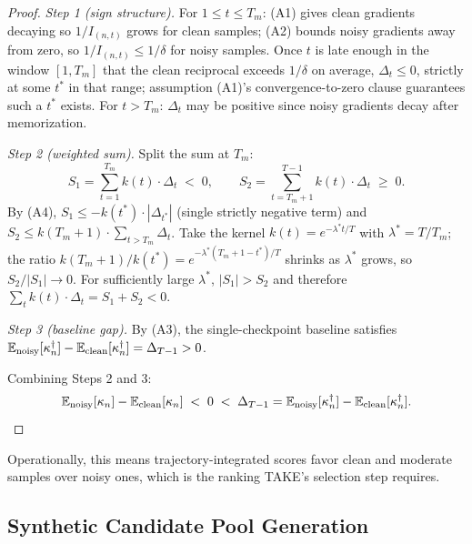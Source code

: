 \begin{foldable}
\begin{proof}
    \textit{Step 1 (sign structure).}
    For $1 \leq t \leq T_m$: (A1) gives clean gradients decaying so $1/I_{(n,t)}$ grows for clean samples; (A2) bounds noisy gradients away from zero, so $1/I_{(n,t)} \leq 1/\delta$ for noisy samples.
    Once $t$ is late enough in the window $[1, T_m]$ that the clean reciprocal exceeds $1/\delta$ on average, $\Delta_t \leq 0$, strictly at some $t^*$ in that range; assumption (A1)'s convergence-to-zero clause guarantees such a $t^*$ exists.
    For $t > T_m$: $\Delta_t$ may be positive since noisy gradients decay after memorization.

    \textit{Step 2 (weighted sum).}
    Split the sum at $T_m$:
    \begin{equation*}
      S_1 = \sum_{t=1}^{T_m} k(t) \cdot \Delta_t \;<\; 0,
      \qquad
      S_2 = \sum_{t=T_m+1}^{T-1} k(t) \cdot \Delta_t \;\geq\; 0.
    \end{equation*}
    By (A4), $S_1 \leq -k(t^*) \cdot |\Delta_{t^*}|$ (single strictly negative term) and $S_2 \leq k(T_m+1) \cdot \sum_{t > T_m} \Delta_t$.
    Take the kernel $k(t) = e^{-\lambda^* t / T}$ with $\lambda^* = T/T_m$; the ratio $k(T_m+1)/k(t^*) = e^{-\lambda^*(T_m+1-t^*)/T}$ shrinks as $\lambda^*$ grows, so $S_2 / |S_1| \to 0$.
    For sufficiently large $\lambda^*$, $|S_1| > S_2$ and therefore $\sum_t k(t) \cdot \Delta_t = S_1 + S_2 < 0$.

    \textit{Step 3 (baseline gap).}
    By (A3), the single-checkpoint baseline satisfies $\mathbb{E}_\textup{noisy}[\kappa^\dagger_n] - \mathbb{E}_\textup{clean}[\kappa^\dagger_n] = \Delta_{T-1} > 0$.

    Combining Steps 2 and 3:
    \begin{equation*}
      \mathbb{E}_\textup{noisy}[\kappa_n] - \mathbb{E}_\textup{clean}[\kappa_n] \;<\; 0 \;<\; \Delta_{T-1} = \mathbb{E}_\textup{noisy}[\kappa^\dagger_n] - \mathbb{E}_\textup{clean}[\kappa^\dagger_n].
    \end{equation*}
  \end{proof}
  Operationally, this means trajectory-integrated scores favor clean and moderate samples over noisy ones, which is the ranking TAKE's selection step requires.
\end{foldable}

\subsection{Synthetic Candidate Pool Generation} \label{sec:53-research03-method-synthetic}

